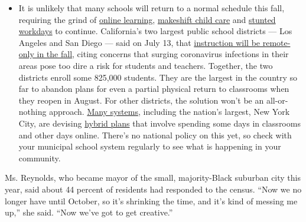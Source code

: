 \begin{itemize}
  \begin{itemize}
  \tightlist
  \item
    It is unlikely that many schools will return to a normal schedule
    this fall, requiring the grind of
    \href{https://www.nytimes.com/2020/06/05/us/coronavirus-education-lost-learning.html?action=click\&pgtype=Article\&state=default\&region=MAIN_CONTENT_3\&context=storylines_faq}{online
    learning},
    \href{https://www.nytimes.com/2020/05/29/us/coronavirus-child-care-centers.html?action=click\&pgtype=Article\&state=default\&region=MAIN_CONTENT_3\&context=storylines_faq}{makeshift
    child care} and
    \href{https://www.nytimes.com/2020/06/03/business/economy/coronavirus-working-women.html?action=click\&pgtype=Article\&state=default\&region=MAIN_CONTENT_3\&context=storylines_faq}{stunted
    workdays} to continue. California's two largest public school
    districts --- Los Angeles and San Diego --- said on July 13, that
    \href{https://www.nytimes.com/2020/07/13/us/lausd-san-diego-school-reopening.html?action=click\&pgtype=Article\&state=default\&region=MAIN_CONTENT_3\&context=storylines_faq}{instruction
    will be remote-only in the fall}, citing concerns that surging
    coronavirus infections in their areas pose too dire a risk for
    students and teachers. Together, the two districts enroll some
    825,000 students. They are the largest in the country so far to
    abandon plans for even a partial physical return to classrooms when
    they reopen in August. For other districts, the solution won't be an
    all-or-nothing approach.
    \href{https://bioethics.jhu.edu/research-and-outreach/projects/eschool-initiative/school-policy-tracker/}{Many
    systems}, including the nation's largest, New York City, are
    devising
    \href{https://www.nytimes.com/2020/06/26/us/coronavirus-schools-reopen-fall.html?action=click\&pgtype=Article\&state=default\&region=MAIN_CONTENT_3\&context=storylines_faq}{hybrid
    plans} that involve spending some days in classrooms and other days
    online. There's no national policy on this yet, so check with your
    municipal school system regularly to see what is happening in your
    community.
  \end{itemize}
\end{itemize}

Ms. Reynolds, who became mayor of the small, majority-Black suburban
city this year, said about 44 percent of residents had responded to the
census. ``Now we no longer have until October, so it's shrinking the
time, and it's kind of messing me up,'' she said. ``Now we've got to get
creative.''

